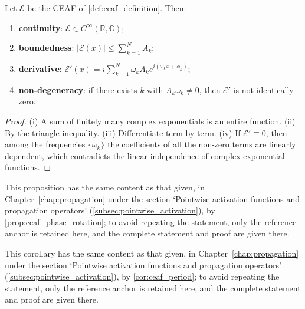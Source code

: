 \begin{proposition}\label{prop:ceaf_basic}
Let $\mathcal{E}$ be the CEAF of \cref{def:ceaf_definition}. Then:
\begin{enumerate}[label=(\roman*)]
    \item \textbf{continuity}: $\mathcal{E}\in C^\infty(\mathbb{R},\mathbb{C})$;
    \item \textbf{boundedness}: $|\mathcal{E}(x)|\le\sum_{k=1}^{N}A_k$;
    \item \textbf{derivative}: $\mathcal{E}'(x) = i\sum_{k=1}^{N}\omega_k A_k e^{i(\omega_k x+\phi_k)}$;
    \item \textbf{non-degeneracy}: if there exists $k$ with $A_k\omega_k\neq 0$, then $\mathcal{E}'$ is not identically zero.
\end{enumerate}
\end{proposition}

\begin{proof}
(i) A sum of finitely many complex exponentials is an entire function. (ii) By the triangle inequality. (iii) Differentiate term by term. (iv) If $\mathcal{E}'\equiv 0$, then among the frequencies $\{\omega_k\}$ the coefficients of all the non-zero terms are linearly dependent, which contradicts the linear independence of complex exponential functions.
\end{proof}

\begin{proposition}\label{prop:ceaf_propagation_anchor}
This proposition has the same content as that given, in Chapter~\ref{chap:propagation} under the section `Pointwise activation functions and propagation operators' (\cref{subsec:pointwise_activation}), by \cref{prop:ceaf_phase_rotation}; to avoid repeating the statement, only the reference anchor is retained here, and the complete statement and proof are given there.
\end{proposition}

\begin{corollary}\label{cor:ceaf_period_ps}
This corollary has the same content as that given, in Chapter~\ref{chap:propagation} under the section `Pointwise activation functions and propagation operators' (\cref{subsec:pointwise_activation}), by \cref{cor:ceaf_period}; to avoid repeating the statement, only the reference anchor is retained here, and the complete statement and proof are given there.
\end{corollary}

